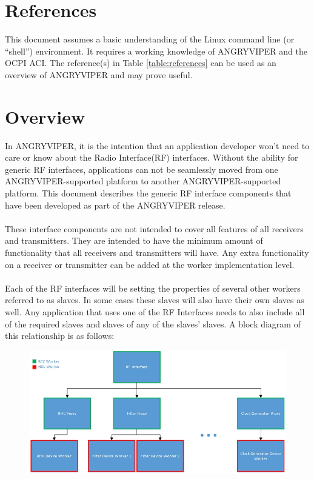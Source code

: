 \newpage

\tableofcontents

\newpage

\section{References}

	This document assumes a basic understanding of the Linux command line (or ``shell'') environment. It requires a working knowledge of ANGRYVIPER and the OCPI ACI.  The reference(s) in Table \ref{table:references} can be used as an overview of ANGRYVIPER and may prove useful.


\newpage
\section{Overview}
In ANGRYVIPER, it is the intention that an application developer won't need to care or know about the Radio Interface(RF) interfaces.  Without the ability for generic RF interfaces, applications can not be seamlessly moved from one ANGRYVIPER-supported platform to another ANGRYVIPER-supported platform.  This document describes the generic RF interface components that have been developed as part of the ANGRYVIPER release.  \\ \\
These interface components are not intended to cover all features of all receivers and transmitters.  They are intended to have the minimum amount of functionality that all receivers and transmitters will have.  Any extra functionality on a receiver or transmitter can be added at the worker implementation level. \\ \\
Each of the RF interfaces will be setting the properties of several other workers referred to as slaves.  In some cases these slaves will also have their own slaves as well.  Any application that uses one of the RF Interfaces needs to also include all of the required slaves and slaves of any of the slaves' slaves.  A block diagram of this relationship is as follows:

	\begin{figure}[h]
	 	\centering
	 	\includegraphics[scale=0.75]{figures/Generic_FE_diagram.jpg}
	\end{figure}
\newpage
